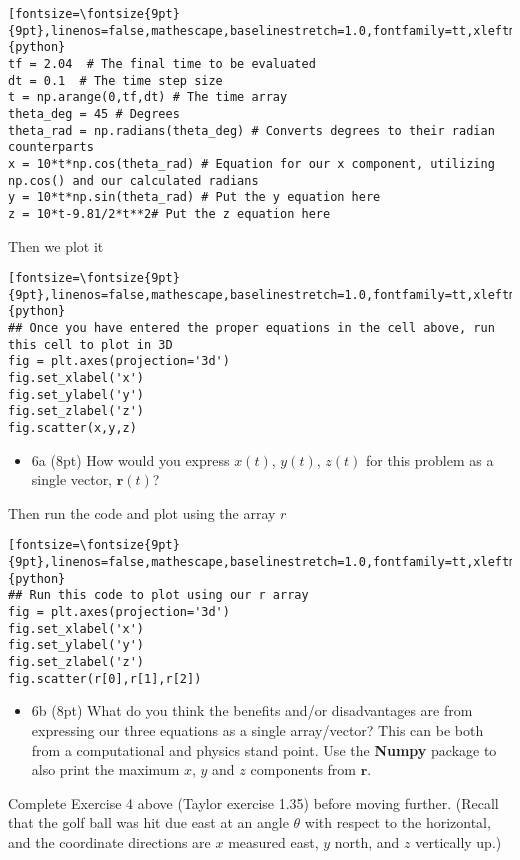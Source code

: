 \documentclass[%
oneside,                 %
final,                   %
10pt]{article}
\begin{document}
\begin{verbatim}[fontsize=\fontsize{9pt}{9pt},linenos=false,mathescape,baselinestretch=1.0,fontfamily=tt,xleftmargin=7mm]{python}
tf = 2.04  # The final time to be evaluated
dt = 0.1  # The time step size
t = np.arange(0,tf,dt) # The time array
theta_deg = 45 # Degrees
theta_rad = np.radians(theta_deg) # Converts degrees to their radian counterparts
x = 10*t*np.cos(theta_rad) # Equation for our x component, utilizing np.cos() and our calculated radians
y = 10*t*np.sin(theta_rad) # Put the y equation here
z = 10*t-9.81/2*t**2# Put the z equation here
\end{verbatim}
Then we plot it
\begin{verbatim}[fontsize=\fontsize{9pt}{9pt},linenos=false,mathescape,baselinestretch=1.0,fontfamily=tt,xleftmargin=7mm]{python}
## Once you have entered the proper equations in the cell above, run this cell to plot in 3D
fig = plt.axes(projection='3d')
fig.set_xlabel('x')
fig.set_ylabel('y')
fig.set_zlabel('z')
fig.scatter(x,y,z)
\end{verbatim}

\begin{itemize}
\item 6a (8pt) How would you express $x(t)$, $y(t)$, $z(t)$ for this problem as a single vector, $\bm{r}(t)$?
\end{itemize}

\noindent
Then run the code and plot using the array $r$
\begin{verbatim}[fontsize=\fontsize{9pt}{9pt},linenos=false,mathescape,baselinestretch=1.0,fontfamily=tt,xleftmargin=7mm]{python}
## Run this code to plot using our r array 
fig = plt.axes(projection='3d')
fig.set_xlabel('x')
fig.set_ylabel('y')
fig.set_zlabel('z')
fig.scatter(r[0],r[1],r[2])
\end{verbatim}

\begin{itemize}
\item 6b (8pt) What do you think the benefits and/or disadvantages are from expressing our three equations as a single array/vector? This can be both from a computational and physics stand point. Use the \textbf{Numpy} package to also print the maximum $x$, $y$ and $z$ components from $\bm{r}$.
\end{itemize}

\noindent
Complete Exercise 4 above (Taylor exercise 1.35) before moving further. (Recall that the golf ball was hit due east at an angle $\theta$ with respect to the horizontal, and the coordinate directions are $x$ measured east, $y$ north, and $z$ vertically up.)
\end{document}
